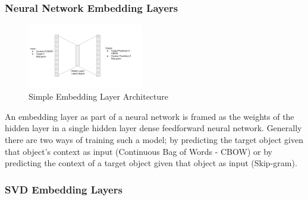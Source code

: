\subsubsection{Neural Network Embedding Layers}
\begin{figure}[h]
    \centering
    \includegraphics[width=0.45\textwidth]{images/nn_embedding_layer.png}
    \caption{Simple Embedding Layer Architecture}
    \label{fig:Embedding Layer Architecture}
\end{figure}
An embedding layer as part of a neural network is framed as the weights of the hidden layer in a single hidden layer dense feedforward neural network. Generally there are two ways of training such a model; by predicting the target object given that object's context as input (Continuous Bag of Words - CBOW) or by predicting the context of a target object given that object as input (Skip-gram).

\subsubsection{SVD Embedding Layers}